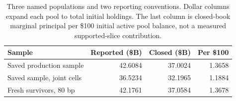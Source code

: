 \begin{table}[H]
\centering\small
\caption{Three named populations and two reporting conventions. Dollar columns expand each pool to total initial holdings. The last column is closed-book marginal principal per \$100 initial active pool balance, not a measured supported-slice contribution.}
\label{tab:populationresults}
\begin{tabular}{@{}p{5.5cm}rrr@{}}\toprule
Sample & Reported (\$B) & Closed (\$B) & Per \$100\\\midrule
Saved production sample & 42.6084 & 37.0024 & 1.3658\\
Saved sample, joint cells & 36.5234 & 32.1965 & 1.1884\\
Fresh survivors, 80 bp & 42.1761 & 37.0584 & 1.3678\\
\bottomrule
\end{tabular}
\end{table}
